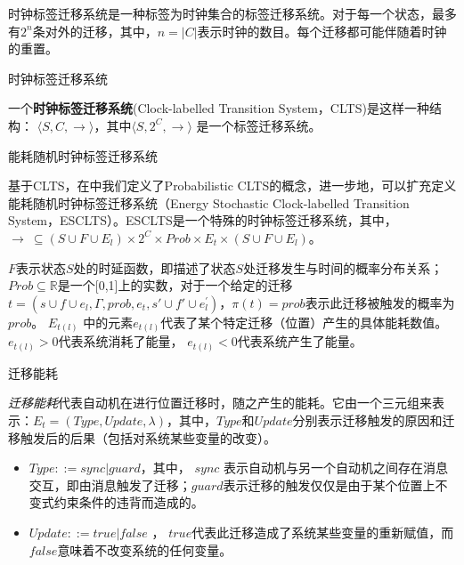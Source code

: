 	时钟标签迁移系统是一种标签为时钟集合的标签迁移系统。对于每一个状态，最多有$2^n$条对外的迁移，其中，$n=|C|$表示时钟的数目。每个迁移都可能伴随着时钟的重置。

	\begin{myDef}时钟标签迁移系统\end{myDef}
	一个\textbf{时钟标签迁移系统}(Clock-labelled Transition System，CLTS)是这样一种结构： $\langle S, C, \longrightarrow\rangle$，其中$\langle S, 2^C, \longrightarrow\rangle$ 是一个标签迁移系统。

	
	\begin{myDef}能耗随机时钟标签迁移系统\end{myDef}
	基于CLTS，在\citep{DBLP:conf/facs2/DuHJMY16}中我们定义了Probabilistic CLTS的概念，进一步地，可以扩充定义能耗随机时钟标签迁移系统（Energy Stochastic Clock-labelled Transition System，ESCLTS）。ESCLTS是一个特殊的时钟标签迁移系统，其中，$\longrightarrow\ \subseteq (S \cup F \cup E_{l}) \times 2^C \times Prob \times E_t \times (S \cup F \cup E_{l})$。
	
	$F$表示状态$S$处的时延函数，即描述了状态$S$处迁移发生与时间的概率分布关系；$Prob \subseteq \mathbb{R}$是一个[0,1]上的实数，对于一个给定的迁移$t=(s \cup f \cup e_{l},\Gamma,prob,e_{t},s' \cup f' \cup e_{l}^{'})$，$\pi(t)=prob$表示此迁移被触发的概率为$prob$。
	$E_{t(l)}$ 中的元素$e_{t(l)}$代表了某个特定迁移（位置）产生的具体能耗数值。$e_{t(l)}>0$代表系统消耗了能量， $e_{t(l)}<0$代表系统产生了能量。

	\begin{myDef}迁移能耗\end{myDef}
\emph{迁移能耗}代表自动机在进行位置迁移时，随之产生的能耗。它由一个三元组来表示：$E_{t} = (Type, Update, \lambda)$，其中，$Type$和$Update$分别表示迁移触发的原因和迁移触发后的后果（包括对系统某些变量的改变）。

	\begin{itemize}
	\item $Type ::= sync | guard$，其中， $sync$ 表示自动机与另一个自动机之间存在消息交互，即由消息触发了迁移；$guard$表示迁移的触发仅仅是由于某个位置上不变式约束条件的违背而造成的。
	\item $Update ::= true | false$ ， $true$代表此迁移造成了系统某些变量的重新赋值，而$false$意味着不改变系统的任何变量。
	\end{itemize}

